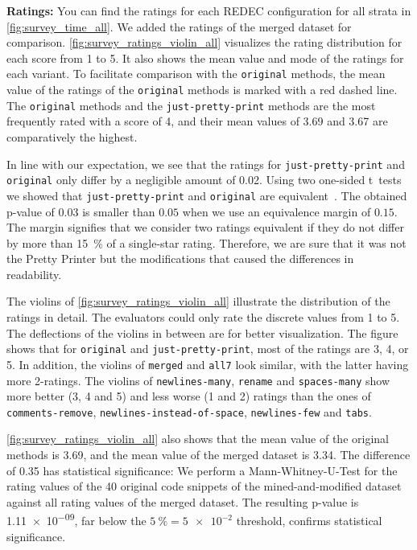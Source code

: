 \documentclass[%
class=scrreprt,
chapterprefix=false,%
open=right,%
twoside=true,%
paper=a4,%
logofile={Logo\_zentral\_farbig\_EN.png},%
thesistype=master,%
UKenglish,%
]{se2thesis}
\theoremstyle{definition}
\newcommand{\rdh}{REDEC\xspace}
\newcommand{\none}{just-pretty-print\xspace} %
\newcommand{\nonet}{\texttt{\none}\xspace} %
\begin{document}
	\textbf{Ratings:}
	You can find the ratings for each \rdh configuration for all strata in \autoref{fig:survey_time_all}. We added the ratings of the merged dataset for comparison. \autoref{fig:survey_ratings_violin_all} visualizes the rating distribution for each score from 1 to 5. It also shows the mean value and mode of the ratings for each variant. To facilitate comparison with the \texttt{original} methods, the mean value of the ratings of the \texttt{original} methods is marked with a red dashed line. The \texttt{original} methods and the \texttt{just-pretty-print} methods are the most frequently rated with a score of 4, and their mean values of 3.69 and 3.67 are comparatively the highest.
		
	In line with our expectation, we see that the ratings for \nonet and \texttt{original} only differ by a negligible amount of 0.02. 
    Using two one-sided t~tests we showed that \nonet and \texttt{original} are equivalent~\cite{schuirmann1987comparison}. The obtained p-value of $0.03$ is smaller than $0.05$ when we use an equivalence margin of $0.15$. The margin signifies that we consider two ratings equivalent if they do not differ by more than 15~\% of a single-star rating.
    Therefore, we are sure that it was not the Pretty Printer but the modifications that caused the differences in readability.
	
	\begin{sloppypar}
	The violins of \autoref{fig:survey_ratings_violin_all} illustrate the distribution of the ratings in detail. The evaluators could only rate the discrete values from 1 to 5. The deflections of the violins in between are for better visualization. The figure shows that for \texttt{original} and \texttt{just-pretty-print}, most of the ratings are 3, 4, or 5. In addition, the violins of \texttt{merged} and \texttt{all7} look similar, with the latter having more 2-ratings. The violins of \texttt{newlines-many}, \texttt{rename} and \texttt{spaces-many} show more better (3, 4 and 5) and less worse (1 and 2) ratings than the ones of \texttt{comments-remove}, \texttt{newlines-instead-of-space}, \texttt{newlines-few} and \texttt{tabs}.
	\end{sloppypar}
		
	\autoref{fig:survey_ratings_violin_all} also shows that the mean value of the original methods is 3.69, and the mean value of the merged dataset is 3.34. The difference of 0.35 has statistical significance:
    We perform a Mann-Whitney-U-Test for the rating values of the 40 original code snippets of the mined-and-modified dataset against all rating values of the merged dataset. The resulting p-value is \num{1.11e-09}, far below the $5~\%=\num{5e-2}$ threshold, confirms statistical significance.
	
\end{document}
